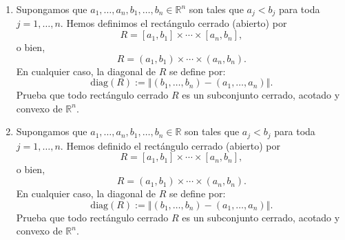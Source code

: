 \documentclass[12pt]{article}
\newcommand{\norm}[1]{\left\Vert#1\right\Vert}
\newcommand{\diag}{\mathrm{diag}}
\newcommand{\Int}{\mathrm{int}}
\newcommand{\R}{\mathbb R}
\newcommand{\x}{\mathrm x}
\begin{document}
\begin{enumerate}
Por otro lado, como $B(\x, \varepsilon) \subseteq \partial \Omega = \Omega \setminus \Int(\Omega)$, se tiene que
\[
B(\x, \varepsilon) \cap \Int(\Omega) = \emptyset.
\]
En particular, $\x \notin \Int(\Omega)$, ya que si $\x \in \Int(\Omega)$, entonces $\x \in B(\x, \varepsilon) \cap \Int(\Omega)$, lo cual contradice que dicha intersección sea vacía.

Hemos llegado a una contradicción: por un lado, $\x \in \Int(\Omega)$, y por otro lado, $\x \notin \Int(\Omega)$. Por lo tanto, nuestra suposición inicial de que $\Int(\partial \Omega) \neq \emptyset$ debe ser falsa.

Concluimos que
\[
\boxed{\Int(\partial \Omega) = \emptyset.}
\]

\textbf{Demostración alternativa (más directa):}

Sea $\x \in \partial \Omega$ un punto arbitrario de la frontera. Demostraremos que $\x$ no puede ser un punto interior de $\partial \Omega$.

Por definición de frontera, toda bola abierta centrada en $\x$ contiene tanto puntos de $\Omega$ como puntos de $\R^n \setminus \Omega$.

Supongamos, para buscar una contradicción, que existe $\varepsilon > 0$ tal que $B(\x, \varepsilon) \subseteq \partial \Omega$. Entonces, en particular, $B(\x, \varepsilon) \subseteq \overline{\Omega} = \Omega$ (ya que $\Omega$ es cerrado). Esto significa que $\x \in \Int(\Omega)$.

Pero $\Int(\Omega) \cap \partial \Omega = \emptyset$, ya que $\partial \Omega = \overline{\Omega} \setminus \Int(\Omega)$. Esto contradice que $B(\x, \varepsilon) \subseteq \partial \Omega$ y que $\x \in B(\x, \varepsilon)$.

Por lo tanto, ningún punto de $\partial \Omega$ puede ser un punto interior de $\partial \Omega$, lo que implica que $\Int(\partial \Omega) = \emptyset$.

\item Supongamos que $a_1,\ldots,a_n,b_1,\ldots,b_n\in \R^n$ son tales que $a_j<b_j$ para toda $j=1,\ldots,n$. Hemos definimos el rectángulo cerrado (abierto) por
\[ R = [a_1,b_1]\times \cdots\times [a_n,b_n], \]
o bien,
\[ R = (a_1,b_1)\times \cdots\times (a_n,b_n). \]
En cualquier caso, la \textsf{diagonal} de $R$ se define por:
\[ \diag(R) := \norm{(b_1,\ldots,b_n) - (a_1,\ldots,a_n)}. \]
Prueba que todo rectángulo cerrado $R$ es un subconjunto cerrado, acotado y convexo de $\R^n$. 
\item Supongamos que $a_1,\ldots,a_n,b_1,\ldots,b_n\in \R$ son tales que $a_j<b_j$ para toda $j=1,\ldots,n$. Hemos definido el rectángulo cerrado (abierto) por
\[ R = [a_1,b_1]\times \cdots\times [a_n,b_n], \]
o bien,
\[ R = (a_1,b_1)\times \cdots\times (a_n,b_n). \]
En cualquier caso, la \textsf{diagonal} de $R$ se define por:
\[ \diag(R) := \norm{(b_1,\ldots,b_n) - (a_1,\ldots,a_n)}. \]
Prueba que todo rectángulo cerrado $R$ es un subconjunto cerrado, acotado y convexo de $\R^n$.


\end{enumerate}
\end{document}
